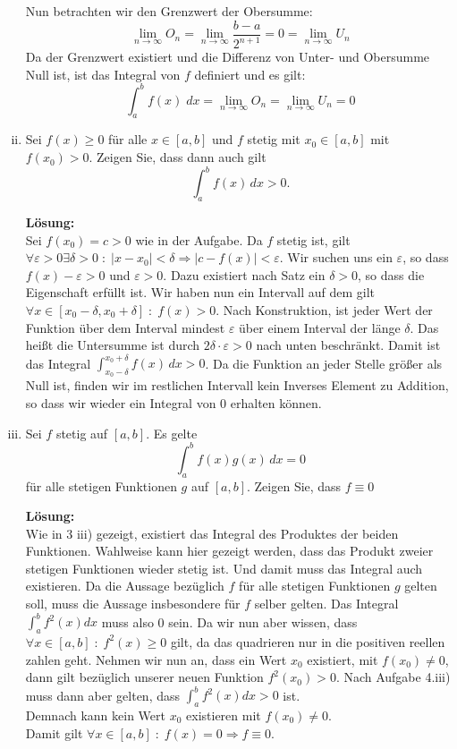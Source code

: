\documentclass[11pt,a4paper,ngerman]{article}
\begin{document}
\begin{enumerate}[i)]
Nun betrachten wir den Grenzwert der Obersumme:
$$
\lim_{n \to \infty}{O_n} = \lim_{n \to \infty}{\frac{b-a}{2^{n+1}}} = 0 = \lim_{n \to \infty}{U_n}
$$
Da der Grenzwert existiert und die Differenz von Unter- und Obersumme Null ist, ist das Integral von $f$ definiert und es gilt:
$$ \int_{a}^{b}{f(x) \; dx} = \lim_{n \to \infty}{O_n} = \lim_{n \to \infty}{U_n} = 0 $$


    \item Sei $f(x) \geq 0$ für alle $x \in [a,b]$ und $f$ stetig mit $x_0 \in [a,b]$ mit $f(x_0) > 0$. Zeigen Sie, dass dann auch gilt
$$
    \int_{a}^{b} f(x) \, dx > 0.
$$

\pagebreak

\textbf{Lösung:}\\

Sei $f(x_0) = c > 0$ wie in der Aufgabe. Da $f$ stetig ist, gilt $\forall \varepsilon > 0 \exists \delta > 0 \; : \; |x - x_0| < \delta \Rightarrow | c - f(x) | < \varepsilon$. Wir suchen uns ein $\varepsilon$, so dass $f(x) - \varepsilon > 0$ und $\varepsilon > 0$. Dazu existiert nach Satz ein $ \delta > 0$, so dass die Eigenschaft erfüllt ist. Wir haben nun ein Intervall auf dem gilt $\forall x \in [x_0 - \delta, x_0 + \delta] \; : \; f(x) > 0$. Nach Konstruktion, ist jeder Wert der Funktion über dem Interval mindest $\varepsilon$ über einem Interval der länge $\delta$. Das heißt die Untersumme ist durch $2\delta \cdot \varepsilon > 0$ nach unten beschränkt. Damit ist das Integral $\int_{x_0 - \delta}^{x_0+\delta} f(x) \, dx > 0$. Da die Funktion an jeder Stelle größer als Null ist, finden wir im restlichen Intervall kein Inverses Element zu Addition, so dass wir wieder ein Integral von 0 erhalten können. 

    \item Sei $f$ stetig auf $[a,b]$. Es gelte
$$
\int_{a}^{b} f(x)g(x) \, dx = 0
$$
für alle stetigen Funktionen $g$ auf $[a,b]$. Zeigen Sie, dass $f\equiv 0$

\textbf{Lösung:}\\
Wie in 3 iii) gezeigt, existiert das Integral des Produktes der beiden Funktionen. Wahlweise kann hier gezeigt werden, dass das Produkt zweier stetigen Funktionen wieder stetig ist. Und damit muss das Integral auch existieren.
Da die Aussage bezüglich $f$ für alle stetigen Funktionen $g$ gelten soll, muss die Aussage insbesondere für $f$ selber gelten. Das Integral $\int_a^b f^2 (x) dx$ muss also 0 sein. Da wir nun aber wissen, dass $\forall x \in [a,b] \; : \; f^2(x) \geq 0$ gilt, da das quadrieren nur in die positiven reellen zahlen geht. Nehmen wir nun an, dass ein Wert $x_0$ existiert, mit $f(x_0) \not=0$, dann gilt bezüglich unserer neuen Funktion $f^2(x_0) > 0$. Nach Aufgabe 4.iii) muss dann aber gelten, dass $\int_a^b f^2(x) dx > 0$ ist.\\

Demnach kann kein Wert $x_0$ existieren mit $f(x_0) \not= 0$.\\ Damit gilt $\forall x \in [a,b] \; : \; f(x) = 0 \Rightarrow f \equiv 0$.


\end{enumerate}
\label{LastPage}
\end{document}
